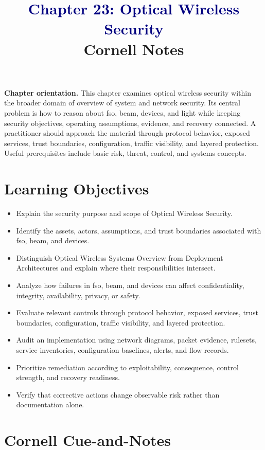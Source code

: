 \documentclass[11pt]{article}
\title{\textcolor{Navy}{Chapter 23: Optical Wireless Security}\\[2mm]\large Cornell Notes}
\author{}
\date{}
\begin{document}
\maketitle
\thispagestyle{fancy}
\vspace{-1.5em}
\begin{orientationbox}
\textbf{Chapter orientation.} This chapter examines optical wireless security within the broader domain of overview of system and network security. Its central problem is how to reason about fso, beam, devices, and light while keeping security objectives, operating assumptions, evidence, and recovery connected. A practitioner should approach the material through protocol behavior, exposed services, trust boundaries, configuration, traffic visibility, and layered protection. Useful prerequisites include basic risk, threat, control, and systems concepts.
\end{orientationbox}
\section*{Learning Objectives}
\begin{itemize}
\item Explain the security purpose and scope of Optical Wireless Security.
\item Identify the assets, actors, assumptions, and trust boundaries associated with fso, beam, and devices.
\item Distinguish Optical Wireless Systems Overview from Deployment Architectures and explain where their responsibilities intersect.
\item Analyze how failures in fso, beam, and devices can affect confidentiality, integrity, availability, privacy, or safety.
\item Evaluate relevant controls through protocol behavior, exposed services, trust boundaries, configuration, traffic visibility, and layered protection.
\item Audit an implementation using network diagrams, packet evidence, rulesets, service inventories, configuration baselines, alerts, and flow records.
\item Prioritize remediation according to exploitability, consequence, control strength, and recovery readiness.
\item Verify that corrective actions change observable risk rather than documentation alone.
\end{itemize}
\section*{Cornell Cue-and-Notes}
\end{document}
